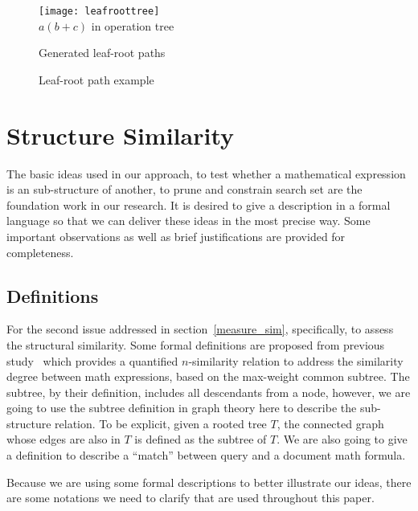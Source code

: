 \begin{figure}
\begin{minipage}[b]{2.65in}
\begin{center}
\texttt{[image: leafroottree]}
\\$a(b+c)$ in operation tree
\end{center}
\end{minipage}
\hspace*{.38in}
\begin{minipage}[b]{2.65in}
\begin{center}
Generated leaf-root paths
\end{center}
\end{minipage}
\caption{Leaf-root path example}\label{oprtreeExample}
\end{figure}

\section{Structure Similarity}
The basic ideas used in our approach, to test whether a mathematical expression is an sub-structure of another, to prune and constrain search set are the foundation work in our research. It is desired to give a description in a formal language so that we can deliver these ideas in the most precise way. Some important observations as well as brief justifications are provided for completeness.

\subsection{Definitions}
For the second issue addressed in section~\ref{measure_sim}, specifically, to assess the structural similarity. 
Some formal definitions are proposed from previous study~\cite{improving09} which provides a quantified \mbox{$n$-similarity} relation to address the similarity degree between math expressions, based on the max-weight common subtree. 
The subtree, by their definition, includes all descendants from a node,
however, we are going to use the subtree definition in graph theory here to describe the sub-structure relation. 
To be explicit, given a rooted tree $T$, the connected graph whose edges are also in $T$ is defined as the subtree of $T$.  
We are also going to give a definition to describe a ``match'' between query and a document math formula.

Because we are using some formal descriptions to better illustrate our ideas, there are some notations we need to clarify that are used throughout this paper. 

